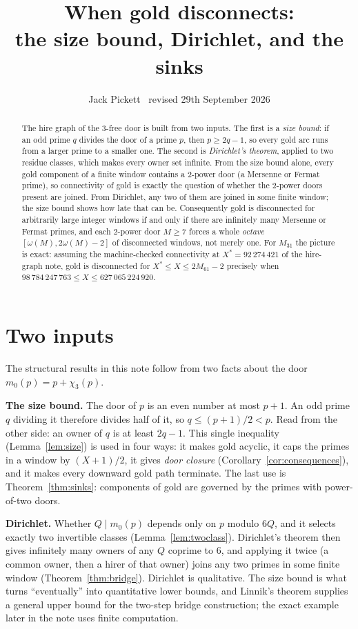 \documentclass[11pt,a4paper]{article}
\title{When gold disconnects:\\ the size bound, Dirichlet, and the sinks}
\author{Jack Pickett \textperiodcentered\ revised 29th September 2026}
\date{}
\theoremstyle{remark}
\newcommand{\chit}{\chi_3}
\begin{document}
\maketitle
\thispagestyle{empty}

\begin{abstract}
The hire graph of the 3-free door is built from two inputs.
The first is a \emph{size bound}: if an odd prime \(q\) divides the door of a prime \(p\), then \(p\ge 2q-1\), so every gold arc runs from a larger prime to a smaller one.
The second is \emph{Dirichlet's theorem}, applied to two residue classes, which makes every owner set infinite.
From the size bound alone, every gold component of a finite window contains a \(2\)-power door (a Mersenne or Fermat prime), so connectivity of gold is exactly the question of whether the \(2\)-power doors present are joined.
From Dirichlet, any two of them are joined in some finite window; the size bound shows how late that can be.
Consequently gold is disconnected for arbitrarily large integer windows if and only if there are infinitely many Mersenne or Fermat primes, and each \(2\)-power door \(M\ge 7\) forces a whole \emph{octave} \([\omega(M),2\omega(M)-2]\) of disconnected windows, not merely one.
For \(M_{31}\) the picture is exact: assuming the machine-checked connectivity at \(X^*=92\,274\,421\) of the hire-graph note, gold is disconnected for \(X^*\le X\le 2M_{61}-2\) precisely when \(98\,784\,247\,763\le X\le 627\,065\,224\,920\).
\end{abstract}

\section{Two inputs}

The structural results in this note follow from two facts about the door \(m_0(p)=p+\chit(p)\).

\medskip
\noindent\textbf{The size bound.}
The door of \(p\) is an even number at most \(p+1\).
An odd prime \(q\) dividing it therefore divides half of it, so \(q\le (p+1)/2<p\).
Read from the other side: an owner of \(q\) is at least \(2q-1\).
This single inequality (Lemma~\ref{lem:size}) is used in four ways: it makes gold acyclic, it caps the primes in a window by \((X+1)/2\), it gives \emph{door closure} (Corollary~\ref{cor:consequences}), and it makes every downward gold path terminate.
The last use is Theorem~\ref{thm:sinks}: components of gold are governed by the primes with power-of-two doors.

\medskip
\noindent\textbf{Dirichlet.}
Whether \(Q\mid m_0(p)\) depends only on \(p\) modulo \(6Q\), and it selects exactly two invertible classes (Lemma~\ref{lem:twoclass}).
Dirichlet's theorem then gives infinitely many owners of any \(Q\) coprime to \(6\), and applying it twice (a common owner, then a hirer of that owner) joins any two primes in some finite window (Theorem~\ref{thm:bridge}).
Dirichlet is qualitative.
The size bound is what turns ``eventually'' into quantitative lower bounds, and Linnik's theorem supplies a general upper bound for the two-step bridge construction; the exact example later in the note uses finite computation.
\end{document}
